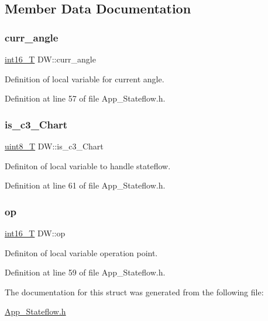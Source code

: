 \subsection{Member Data Documentation}
\mbox{\label{struct_d_w_ab0801640ad5fc131a2c3e085d9986836}} 
\subsubsection{\texorpdfstring{curr\_angle}{curr\_angle}}
{\footnotesize\ttfamily \mbox{\hyperlink{_app___stateflowtypes_8h_ad73c6af88bb2ce70799e51f639309f21}{int16\+\_\+T}} D\+W\+::curr\+\_\+angle}



Definition of local variable for current angle. 



Definition at line 57 of file App\+\_\+\+Stateflow.\+h.

\mbox{\label{struct_d_w_a3b1191ce727da1e17f5a8923eb06ae80}} 
\subsubsection{\texorpdfstring{is\_c3\_Chart}{is\_c3\_Chart}}
{\footnotesize\ttfamily \mbox{\hyperlink{_app___stateflowtypes_8h_a2532a6244e023eee49f315c10f1f7c53}{uint8\+\_\+T}} D\+W\+::is\+\_\+c3\+\_\+\+Chart}



Definiton of local variable to handle stateflow. 



Definition at line 61 of file App\+\_\+\+Stateflow.\+h.

\mbox{\label{struct_d_w_a2736d80f513d2e420f13698e8baa6c59}} 
\subsubsection{\texorpdfstring{op}{op}}
{\footnotesize\ttfamily \mbox{\hyperlink{_app___stateflowtypes_8h_ad73c6af88bb2ce70799e51f639309f21}{int16\+\_\+T}} D\+W\+::op}



Definiton of local variable operation point. 



Definition at line 59 of file App\+\_\+\+Stateflow.\+h.



The documentation for this struct was generated from the following file\+:\begin{DoxyCompactItemize}
\item 
\mbox{\hyperlink{_app___stateflow_8h}{App\+\_\+\+Stateflow.\+h}}\end{DoxyCompactItemize}
